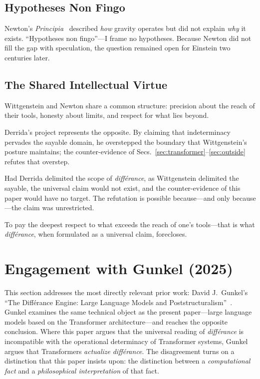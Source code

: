 \documentclass[a4paper,twocolumn,11pt]{article}
\begin{document}
\subsection{Hypotheses Non Fingo}

Newton's \emph{Principia}~\cite{Newton1687} described \emph{how} gravity operates but did not explain \emph{why} it exists. ``Hypotheses non fingo''---I frame no hypotheses. Because Newton did not fill the gap with speculation, the question remained open for Einstein two centuries later.

\subsection{The Shared Intellectual Virtue}

Wittgenstein and Newton share a common structure: precision about the reach of their tools, honesty about limits, and respect for what lies beyond.

Derrida's project represents the opposite. By claiming that indeterminacy pervades the sayable domain, he overstepped the boundary that Wittgenstein's posture maintains; the counter-evidence of Secs.~\ref{sec:transformer}--\ref{sec:outside} refutes that overstep.

Had Derrida delimited the scope of \emph{diff\'erance}, as Wittgenstein delimited the sayable, the universal claim would not exist, and the counter-evidence of this paper would have no target. The refutation is possible because---and only because---the claim was unrestricted.

To pay the deepest respect to what exceeds the reach of one's tools---that is what \emph{diff\'erance}, when formulated as a universal claim, forecloses.



\section{Engagement with Gunkel (2025)}
\label{sec:gunkel}

This section addresses the most directly relevant prior work: David J.\ Gunkel's ``The Diff\'erance Engine: Large Language Models and Poststructuralism''~\cite{Gunkel2025}. Gunkel examines the same technical object as the present paper---large language models based on the Transformer architecture---and reaches the opposite conclusion. Where this paper argues that the universal reading of \emph{diff\'erance} is incompatible with the operational determinacy of Transformer systems, Gunkel argues that Transformers \emph{actualize} \emph{diff\'erance}. The disagreement turns on a distinction that this paper insists upon: the distinction between a \emph{computational fact} and a \emph{philosophical interpretation} of that fact.
\end{document}
